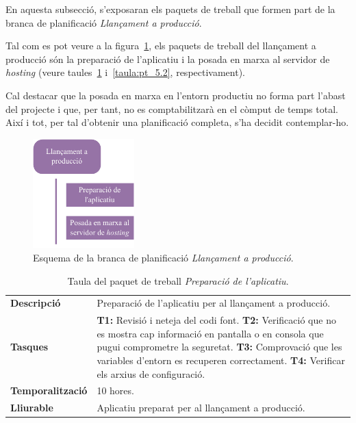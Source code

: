 \documentclass[a4paper,12pt]{ThesisStyle}
\begin{document}
En aquesta subsecció, s'exposaran els paquets de treball que formen part de la branca de planificació \emph{Llançament a producció}.

Tal com es pot veure a la figura~\ref{img:pt_llancament_roduccio}, els paquets de treball del llançament a producció són la preparació de l'aplicatiu i la posada en marxa al servidor de \textit{hosting} (veure taules~\ref{taula:pt_5.1} i~\ref{taula:pt_5.2}, respectivament).

Cal destacar que la posada en marxa en l'entorn productiu no forma part l'abast del projecte i que, per tant, no es comptabilitzarà en el còmput de temps total. Així i tot, per tal d'obtenir una planificació completa, s'ha decidit contemplar-ho.

\begin{figure}[htpb]
	\centering
	\includegraphics[width=0.35\textwidth]{assets/working_packages/llancamentProduccio.pdf}
	\caption{\label{img:pt_llancament_roduccio}Esquema de la branca de planificació \emph{Llançament a producció}.}
\end{figure}

\begin{table}[H]
  \begin{tabularx}{\textwidth}{l | X}
    \toprule
    \rowcolor{Purple}
    \multicolumn{2}{c}{\texttt{\textbf{PT\_5.1:}} Preparació de l'aplicatiu}\\
    \midrule[0.9pt]
    \textbf{Descripció}       & Preparació de l'aplicatiu per al llançament a producció.\\
    \midrule
    \textbf{Tasques}          & \textbf{T1:} Revisió i neteja del codi font.
    \newline \textbf{T2:} Verificació que no es mostra cap informació en pantalla o en consola que pugui comprometre la seguretat.
    \newline \textbf{T3:} Comprovació que les variables d'entorn es recuperen correctament.
    \newline \textbf{T4:} Verificar els arxius de configuració.\\
    \midrule
    \textbf{Temporalització}  & 10 hores.\\
    \midrule
    \textbf{Lliurable}        & Aplicatiu preparat per al llançament a producció.\\
    \bottomrule
  \end{tabularx}
  \caption{\label{taula:pt_5.1} Taula del paquet de treball \emph{Preparació de l'aplicatiu}.}
\end{table}
\end{document}
